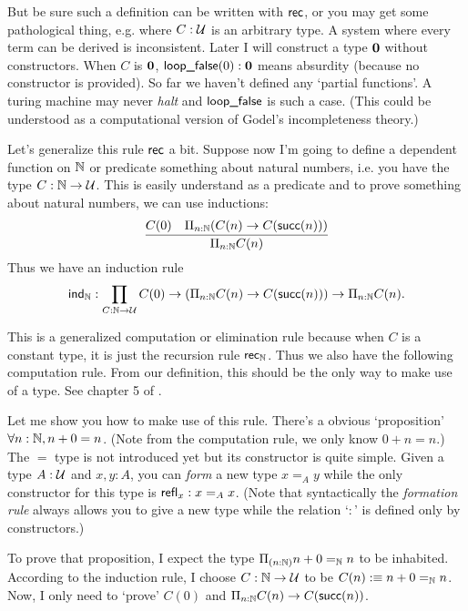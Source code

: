 But be sure such a definition can be written with $\text{\sf rec}$, or you may
get some pathological thing, e.g.
where $C:\mathcal{U}$ is an arbitrary type. A system where every term
can be derived is inconsistent. Later I will construct a type $\mathbf{0}$ 
without constructors. When $C$ is $\mathbf{0}$, $\text{\sf loop\_false}(0):\mathbf{0}$ 
means absurdity (because no constructor is provided). So far we haven't
defined any `partial functions'. A turing machine may never {\it halt}
and $\text{\sf loop\_false}$ is such a case. (This could be understood as a
computational version of Godel's incompleteness theory.)

Let's generalize this rule $\text{\sf rec}$ a bit. Suppose now I'm going to define
a dependent function on $\mathbb{N}$ or predicate something about natural numbers,
i.e. you have the type $C: \mathbb{N}\to\mathcal{U}$. This is easily understand as
a predicate and to prove something about natural numbers, we can use inductions:
$$
    \infer{\Pi_{n:\nat}C(n)}{C(0) & \Pi_{n:\nat}(C(n)\to C(\succn(n)))}
$$
\newcommand{\ind}{\name{ind}}
Thus we have an induction rule 
$$
\ind_\nat: \prod_{C:\nat\to\universe}C(0)
    \to(\Pi_{n:\nat}C(n)\to C(\succn(n)))
    \to\Pi_{n:\nat} C(n).
$$

This is a generalized computation or elimination rule because when
$C$ is a constant type, it is just the recursion rule $\text{\sf rec}_{\mathbb{N}}$. 
Thus we also have the following computation rule.
\eq{
    \ind_\nat(C,c_0,c_s,0) &\defn c_0 \\
    \ind_\nat(C,c_0,c_s,\succn(n)) &\defn c_s(n,\ind_\nat(C,c_0,c_s,n))
}
From our definition, this should be the only way to make use of a type.
See chapter 5 of \cite{homotopy-type-theory}. 

\newcommand{\refl}{\name{refl}}
Let me show you how to make use of this rule. There's a obvious `proposition'
$\forall n:\mathbb{N}, n + 0 = n$. (Note from the computation rule, we only know
$0+n=n$.) The $=$ type is not introduced yet but its constructor is quite 
simple. Given a type $A:\mathcal{U}$ and $x,y:A$, you can {\it form} a new 
type $x=_Ay$ while the only constructor for this type is $\refl_x: x=_Ax$. 
(Note that syntactically the {\it formation rule} always allows you to 
give a new type while the relation `$:$' is defined only by constructors.)

To prove that proposition, I expect the type $\Pi_{(n:\mathbb{N})}n+0 =_{\mathbb{N}} n$
to be inhabited. According to the induction rule, I choose $C: \mathbb{N}\to\mathcal{U}$
to be $C(n):\equiv n+0=_{\mathbb{N}} n$. 
Now, I only need to `prove' $C(0)$ and $\Pi_{n:\mathbb{N}}C(n)\to C(\text{\sf succ}(n))$.


